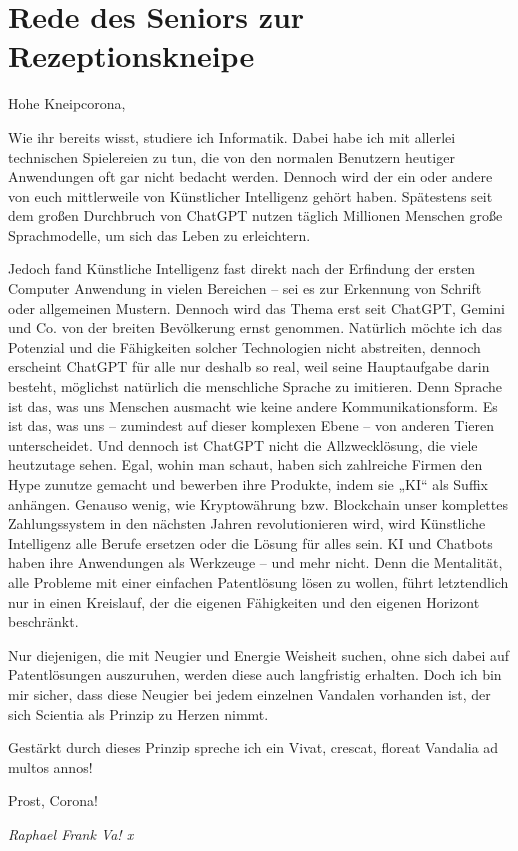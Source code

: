 \section{Rede des Seniors zur Rezeptionskneipe}
Hohe Kneipcorona,
\begin{multicols}{2}
Wie ihr bereits wisst, studiere ich Informatik. Dabei habe ich mit allerlei
technischen Spielereien zu tun, die von den normalen Benutzern heutiger
Anwendungen oft gar nicht bedacht werden. Dennoch wird der ein oder andere von euch mittlerweile von Künstlicher
Intelligenz gehört haben. Spätestens seit dem großen Durchbruch von ChatGPT
nutzen täglich Millionen Menschen große Sprachmodelle, um sich das Leben zu
erleichtern.

Jedoch fand Künstliche Intelligenz fast
direkt nach der Erfindung der ersten Computer Anwendung in vielen Bereichen –
sei es zur Erkennung von Schrift oder allgemeinen Mustern. Dennoch wird das
Thema erst seit ChatGPT, Gemini und Co. von der breiten Bevölkerung ernst
genommen. Natürlich möchte ich das Potenzial und die Fähigkeiten solcher
Technologien nicht abstreiten, dennoch erscheint ChatGPT für alle nur deshalb
so real, weil seine Hauptaufgabe darin besteht, möglichst natürlich die
menschliche Sprache zu imitieren. Denn Sprache ist das, was uns Menschen
ausmacht wie keine andere Kommunikationsform. Es ist das, was uns – zumindest
auf dieser komplexen Ebene – von anderen Tieren unterscheidet.
\newline
Und dennoch ist ChatGPT nicht die
Allzwecklösung, die viele heutzutage sehen. Egal, wohin man schaut, haben sich
zahlreiche Firmen den Hype zunutze gemacht und bewerben ihre Produkte, indem
sie „KI“ als Suffix anhängen. Genauso wenig, wie Kryptowährung bzw. Blockchain
unser komplettes Zahlungssystem in den nächsten Jahren revolutionieren wird,
wird Künstliche Intelligenz alle Berufe ersetzen oder die Lösung für alles
sein. KI und Chatbots haben ihre Anwendungen als Werkzeuge – und mehr nicht.
Denn die Mentalität, alle Probleme mit einer einfachen Patentlösung lösen zu
wollen, führt letztendlich nur in einen Kreislauf, der die eigenen Fähigkeiten
und den eigenen Horizont beschränkt.

Nur diejenigen, die mit Neugier und
Energie Weisheit suchen, ohne sich dabei auf Patentlösungen auszuruhen, werden
diese auch langfristig erhalten. Doch ich bin mir sicher, dass diese Neugier
bei jedem einzelnen Vandalen vorhanden ist, der sich Scientia als Prinzip zu
Herzen nimmt.

Gestärkt durch dieses Prinzip spreche ich
ein Vivat, crescat, floreat Vandalia ad multos annos!

Prost, Corona!

	\begin{flushright}
		\hfill\emph{Raphael Frank Va! x}
	\end{flushright}
\end{multicols}


